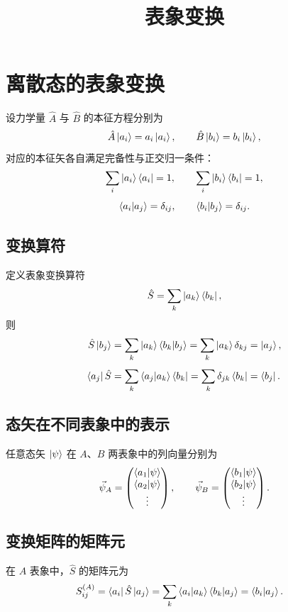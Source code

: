 \documentclass[12pt,a4paper]{article}
\title{表象变换}
\author{}
\date{}
\begin{document}
\maketitle

\section{离散态的表象变换}

设力学量 $\hat{A}$ 与 $\hat{B}$ 的本征方程分别为
\[
\hat{A}\ket{a_i}=a_i\ket{a_i},\qquad \hat{B}\ket{b_i}=b_i\ket{b_i},
\]
对应的本征矢各自满足完备性与正交归一条件：
\[
\sum_i\ket{a_i}\bra{a_i}=1,\qquad \sum_i\ket{b_i}\bra{b_i}=1,
\]
\[
\braket{a_i|a_j}=\delta_{ij},\qquad \braket{b_i|b_j}=\delta_{ij}.
\]

\subsection{变换算符}

定义表象变换算符
\[
\hat{S}=\sum_k\ket{a_k}\bra{b_k},
\]
则
\begin{align*}
\hat{S}\ket{b_j}&=\sum_k\ket{a_k}\braket{b_k|b_j}=\sum_k\ket{a_k}\delta_{kj}=\ket{a_j},\\[4pt]
\bra{a_j}\hat{S}&=\sum_k\braket{a_j|a_k}\bra{b_k}=\sum_k\delta_{jk}\bra{b_k}=\bra{b_j}.
\end{align*}

\subsection{态矢在不同表象中的表示}

任意态矢 $\ket{\psi}$ 在 $A$、$B$ 两表象中的列向量分别为
\[
\vec{\psi}_A=\begin{pmatrix}\braket{a_1|\psi}\\ \braket{a_2|\psi}\\ \vdots\end{pmatrix},
\qquad
\vec{\psi}_B=\begin{pmatrix}\braket{b_1|\psi}\\ \braket{b_2|\psi}\\ \vdots\end{pmatrix}.
\]

\subsection{变换矩阵的矩阵元}

在 $A$ 表象中，$\hat{S}$ 的矩阵元为
\begin{align*}
S_{ij}^{(A)}&=\bra{a_i}\hat{S}\ket{a_j}
=\sum_k\braket{a_i|a_k}\braket{b_k|a_j}
=\braket{b_i|a_j}.
\end{align*}
\end{document}
